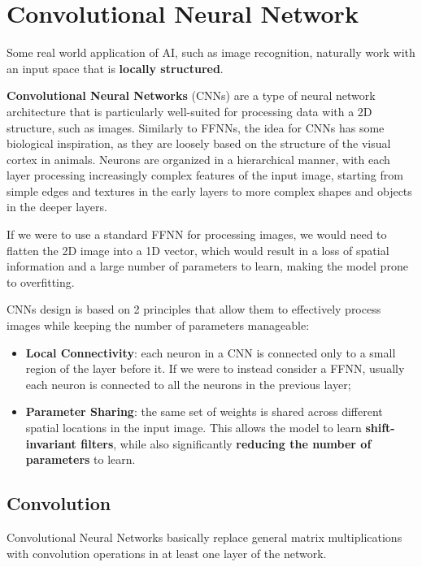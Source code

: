 \section{Convolutional Neural Network}
Some real world application of AI, such as image recognition, naturally work with an input space that is \textbf{locally structured}.

\textbf{Convolutional Neural Networks} (CNNs) are a type of neural network architecture that is particularly well-suited for 
processing data with a 2D structure, such as images.
Similarly to FFNNs, the idea for CNNs has some biological inspiration, as they are loosely based on the structure of the visual cortex in animals.
Neurons are organized in a hierarchical manner, with each layer processing increasingly complex features of the input image, starting from simple edges and 
textures in the early layers to more complex shapes and objects in the deeper layers.

If we were to use a standard FFNN for processing images, we would need to flatten the 2D image into a 1D vector, which would result in a loss
of spatial information and a large number of parameters to learn, making the model prone to overfitting.

CNNs design is based on 2 principles that allow them to effectively process images while keeping the number of parameters manageable:
\begin{itemize}
    \item \textbf{Local Connectivity}: each neuron in a CNN is connected only to a small region of the layer before it. If we were to instead
    consider a FFNN, usually each neuron is connected to all the neurons in the previous layer;
    \item \textbf{Parameter Sharing}: the same set of weights is shared across different spatial locations in the input image.
    This allows the model to learn \textbf{shift-invariant filters}, while also significantly \textbf{reducing the number of parameters} to learn.
\end{itemize}

\subsection{Convolution}
Convolutional Neural Networks basically replace general matrix multiplications with convolution operations in at least one layer of the network.

